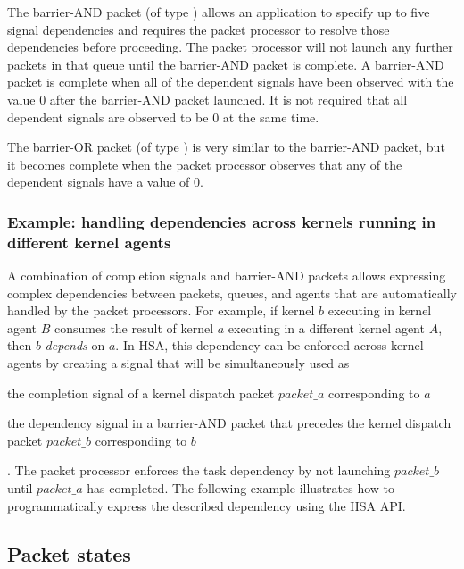 \documentclass[oneside]{book}
\begin{document}
The barrier-AND packet (of type ) allows an
application to specify up to five signal dependencies and requires the packet
processor to resolve those dependencies before proceeding. The packet processor
will not launch any further packets in that queue until the barrier-AND packet
is complete. A barrier-AND packet is complete when all of the dependent signals
have been observed with the value 0 after the barrier-AND packet launched. It is
not required that all dependent signals are observed to be 0 at the same time.

The barrier-OR packet (of type ) is very similar
to the barrier-AND packet, but it becomes complete when the packet processor
observes that any of the dependent signals have a value of 0.

\subsubsection{Example: handling dependencies across kernels running in
  different kernel agents}
A combination of completion signals and barrier-AND packets allows expressing
complex dependencies between packets, queues, and agents that are
automatically handled by the packet processors. For example, if kernel $b$
executing in kernel agent $B$ consumes the result of kernel $a$ executing in a
different kernel agent $A$, then $b$ \textit{depends} on $a$. In HSA, this
dependency can be enforced across kernel agents by creating a signal that will
be simultaneously used as \begin{inparaenum}[1\upshape)] \item the completion
  signal of a kernel dispatch packet $packet\_a$ corresponding to $a$ \item the
  dependency signal in a barrier-AND packet that precedes the kernel dispatch
  packet $packet\_b$ corresponding to $b$\end{inparaenum}. The packet processor
enforces the task dependency by not launching $packet\_b$ until $packet\_a$ has
completed. The following example illustrates how to programmatically express the
described dependency using the HSA API.

\subsection{Packet states}\label{packet-states}
\end{document}
